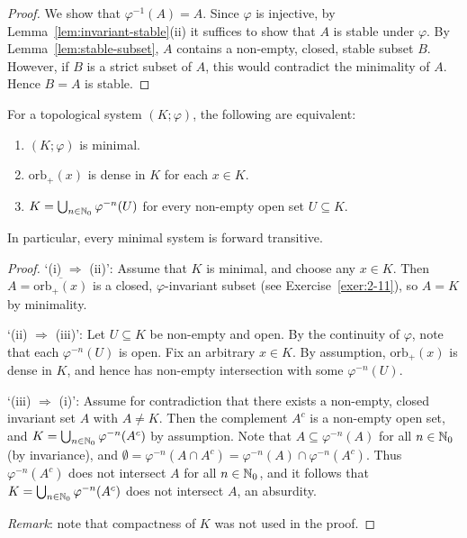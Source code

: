 \begin{proof}
	We show that $\varphi^{-1}(A) = A$. Since $\varphi$ is injective, by Lemma~\ref{lem:invariant-stable}(ii) it suffices to show that $A$ is stable under $\varphi$. By Lemma~\ref{lem:stable-subset}, $A$ contains a non-empty, closed, stable subset $B$. However, if $B$ is a strict subset of $A$, this would contradict the minimality of $A$. Hence $B=A$ is stable.
\end{proof}

\begin{proposition}
	For a topological system $(K;\varphi)$, the following are equivalent:
	\begin{enumerate}[\upshape (i)]
		\item $(K;\varphi)$ is minimal.
		\item $\mathrm{orb}_+(x)$ is dense in $K$ for each $x\in K$.
		\item $K = \bigcup_{n\in\mathbb{N}_0} \varphi^{-n}(U)$ for every non-empty open set $U \subseteq K$.
	\end{enumerate}
	In particular, every minimal system is forward transitive.
\end{proposition}

\begin{proof}
	`(i) $\Rightarrow$ (ii)': Assume that $K$ is minimal, and choose any $x\in K$. Then $A = \overline{\mathrm{orb}_+(x)}$ is a closed, $\varphi$-invariant subset (see Exercise~\ref{exer:2-11}), so $A=K$ by minimality.
	
	`(ii) $\Rightarrow$ (iii)': Let $U \subseteq K$ be non-empty and open. By the continuity of $\varphi$, note that each $\varphi^{-n}(U)$ is open. Fix an arbitrary $x\in K$. By assumption, $\mathrm{orb}_+(x)$ is dense in $K$, and hence has non-empty intersection with some $\varphi^{-n}(U)$.
	
	`(iii) $\Rightarrow$ (i)': Assume for contradiction that there exists a non-empty, closed invariant set $A$ with $A \ne K$. Then the complement $A^c$ is a non-empty open set, and $K = \bigcup_{n\in\mathbb{N}_0} \varphi^{-n}(A^c)$ by assumption. Note that $A \subseteq \varphi^{-n}(A)$ for all $n\in\mathbb{N}_0$ (by invariance), and $\emptyset = \varphi^{-n}(A \cap A^c) = \varphi^{-n}(A) \cap \varphi^{-n}(A^c)$. Thus $\varphi^{-n}(A^c)$ does not intersect $A$ for all $n\in\mathbb{N}_0$, and it follows that $K = \bigcup_{n\in\mathbb{N}_0} \varphi^{-n}(A^c)$ does not intersect $A$, an absurdity.
	
	\emph{Remark}: note that compactness of $K$ was not used in the proof.
\end{proof}

